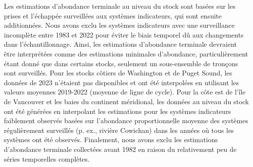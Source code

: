 Les estimations d'abondance terminale au niveau du stock sont basées sur les prises et l'échappée surveillées aux systèmes indicateurs, qui sont ensuite additionnées. Nous avons exclu les systèmes indicateurs avec une surveillance incomplète entre 1983 et 2022 pour éviter le biais temporel dû aux changements dans l'échantillonnage. Ainsi, les estimations d'abondance terminale devraient être interprétées comme des estimations minimales d'abondance, particulièrement étant donné que dans certains stocks, seulement un sous-ensemble de tronçons sont surveillés. Pour les stocks côtiers de Washington et de Puget Sound, les données de 2023 n'étaient pas disponibles et ont été interpolées en utilisant les valeurs moyennes 2019-2022 (moyenne de ligne de cycle). Pour la côte est de l'île de Vancouver et les baies du continent méridional, les données au niveau du stock ont été générées en interpolant les estimations pour les systèmes indicateurs faiblement observés basées sur l'abondance proportionnelle moyenne des systèmes régulièrement surveillés (p. ex., rivière Cowichan) dans les années où tous les systèmes ont été observés. Finalement, nous avons exclu les estimations d'abondance terminale collectées avant 1982 en raison du relativement peu de séries temporelles complètes. 